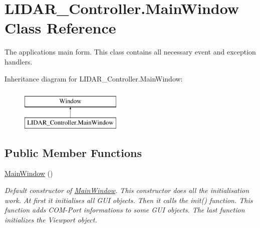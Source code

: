 \hypertarget{class_l_i_d_a_r___controller_1_1_main_window}{}\section{L\+I\+D\+A\+R\+\_\+\+Controller.\+Main\+Window Class Reference}
\label{class_l_i_d_a_r___controller_1_1_main_window}


The application\textquotesingle{}s main form. This class contains all necessary event and exception handlers.  


Inheritance diagram for L\+I\+D\+A\+R\+\_\+\+Controller.\+Main\+Window\+:\begin{figure}[H]
\begin{center}
\leavevmode
\includegraphics[height=2.000000cm]{class_l_i_d_a_r___controller_1_1_main_window}
\end{center}
\end{figure}
\subsection*{Public Member Functions}
\begin{DoxyCompactItemize}
\item 
\hyperlink{class_l_i_d_a_r___controller_1_1_main_window_adb6496654efc3e0d3d8b2db6b220252a}{Main\+Window} ()
\begin{DoxyCompactList}\small\item\em Default constructor of \hyperlink{class_l_i_d_a_r___controller_1_1_main_window}{Main\+Window}. This constructor does all the initialisation work. At first it initialises all G\+UI objects. Then it calls the init() function. This function adds C\+O\+M-\/\+Port informations to some G\+UI objects. The last function initializes the Viewport object. \end{DoxyCompactList}\end{DoxyCompactItemize}
